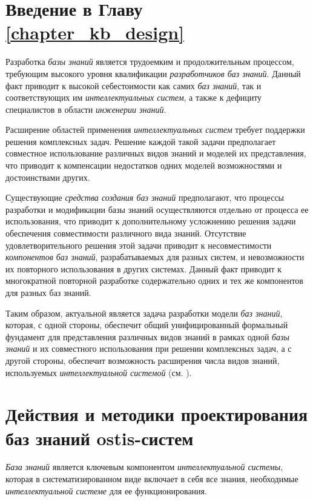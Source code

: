\section*{Введение в Главу \ref{chapter_kb_design}}

Разработка \textit{базы знаний} является трудоемким и продолжительным процессом, требующим высокого уровня квалификации \textit{разработчиков баз знаний}. Данный факт приводит к высокой себестоимости как самих \textit{баз знаний}, так и соответствующих им \textit{интеллектуальных систем}, а также к дефициту специалистов в области \textit{инженерии знаний}.

Расширение областей применения \textit{интеллектуальных систем} требует поддержки решения комплексных задач.
Решение каждой такой задачи предполагает совместное использование различных видов знаний и моделей их представления, что приводит к компенсации недостатков одних моделей возможностями и достоинствами других.

Существующие \textit{средства создания баз знаний} предполагают, что процессы разработки и модификации базы знаний осуществляются отдельно от процесса ее использования, что приводит к дополнительному усложнению решения задачи обеспечения совместимости различного вида знаний.
Отсутствие удовлетворительного решения этой задачи приводит к несовместимости \textit{компонентов баз знаний}, разрабатываемых для разных систем, и невозможности их повторного использования в других системах.
Данный факт приводит к многократной повторной разработке содержательно одних и тех же компонентов для разных баз знаний.

Таким образом, актуальной является задача разработки модели \textit{баз знаний}, которая, с одной стороны, обеспечит общий унифицированный формальный фундамент для представления различных видов знаний в рамках одной \textit{базы знаний} и их совместного использования при решении комплексных задач, а с другой стороны, обеспечит возможность расширения числа видов знаний, используемых \textit{интеллектуальной системой} (см. ).


\section{Действия и методики проектирования баз знаний ostis-систем}
\label{sec_kb_design_methods}

\textit{База знаний} является ключевым компонентом \textit{интеллектуальной системы}, которая в систематизированном виде включает в себя все знания, необходимые \textit{интеллектуальной системе} для ее функционирования.


